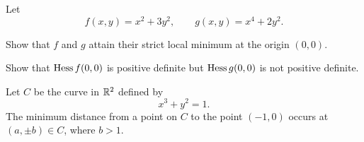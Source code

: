 \begin{problem}
Let
\[
f(x, y)=x^2+3y^2,
\qquad
g(x, y)=x^4+2y^2.
\]
\begin{problemsubparts}
\item Show that $f$ and $g$ attain their strict local minimum at the origin $(0, 0)$.
\item Show that $\operatorname{Hess} f(0, 0)$ is positive definite but $\operatorname{Hess} g(0, 0)$ is not positive definite.
\end{problemsubparts}
\end{problem}

\begin{problem}
Let $C$ be the curve in $\mathbb{R}^2$ defined by
\[
x^3+y^2=1.
\]
The minimum distance from a point on $C$ to the point $(-1, 0)$ occurs at $(a, \pm b)\in C$, where $b>1$.


\end{problem}
